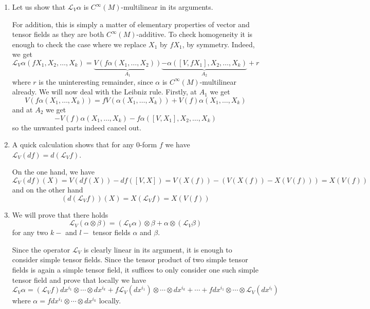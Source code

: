 \documentclass[a4paper, 12pt]{article}
\begin{document}
\begin{Exercise}
    \begin{enumerate}[label=(\roman*)]
        \item Let us show that $\mathcal{L}_V\alpha$ is $C^\infty(M)$-multilinear in its arguments.

            For addition, this is simply a matter of elementary properties of vector and tensor fields as they are both $C^\infty(M)$-additive.
            To check homogeneity it is enough to check the case where we replace $X_1$ by $fX_1$, by symmetry.
            Indeed, we get
            \[
                \mathcal{L}_V\alpha(fX_1,X_2,\dots,X_k) = \underbrace{V(f\alpha(X_1,\dots,X_2))}_{A_1} \underbrace{-\alpha([V,fX_1],X_2,\dots,X_k)}_{A_2} + r
            \]
            where $r$ is the uninteresting remainder, since $\alpha$ is $C^\infty(M)$-multilinear already.
            We will now deal with the Leibniz rule.
            Firstly, at $A_1$ we get
            \[
                V(f\alpha(X_1,\dots,X_k)) = fV(\alpha(X_1,\dots,X_k)) + V(f)\alpha(X_1,\dots,X_k)
            \]
            and at $A_2$ we get
            \[
                -V(f)\alpha(X_1,\dots,X_k) - f\alpha([V,X_1],X_2,\dots,X_k)
            \]
            so the unwanted parts indeed cancel out.
        \item A quick calculation shows that for any $0$-form $f$ we have $\mathcal{L}_V(df) = d(\mathcal{L}_Vf)$.
            
            On the one hand, we have
            \[
                \mathcal{L}_V(df)(X) = V(df(X)) - df([V,X])
                = V(X(f)) - (V(X(f)) - X(V(f))) = X(V(f))
            \]
            and on the other hand
            \[
                (d(\mathcal{L}_Vf))(X) = X(\mathcal{L}_Vf) = X(V(f))
            \]
        \item We will prove that there holds
            \[
                \mathcal{L}_V(\alpha\otimes\beta) = (\mathcal{L}_V\alpha)\otimes\beta + \alpha\otimes(\mathcal{L}_V\beta)
            \]
            for any two $k-$ and $l-$ tensor fields $\alpha$ and $\beta$.

            Since the operator $\mathcal{L}_V$ is clearly linear in its argument,
            it is enough to consider simple tensor fields.
            Since the tensor product of two simple tensor fields is again a simple tensor field,
            it suffices to only consider one such simple tensor field and prove that locally we have
            \[
                \mathcal{L}_V\alpha = (\mathcal{L}_Vf)dx^{i_1}\otimes \cdots \otimes dx^{i_k} + f\mathcal{L}_V(dx^{i_1})\otimes\cdots\otimes dx^{i_k} + \cdots + f dx^{i_1}\otimes\cdots\otimes\mathcal{L}_V(dx^{i_l})
            \]
            where $\alpha = f dx^{i_1} \otimes \cdots \otimes dx^{i_k}$ locally.


\end{enumerate}
\end{Exercise}
\end{document}
